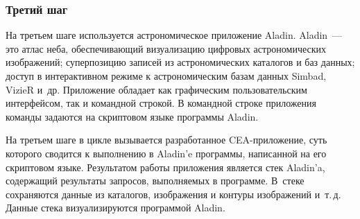 \begin{multicols}{2}
\subsubsection{Третий шаг}

     На третьем шаге используется астрономическое приложение Aladin. Aladin~--- это
атлас неба, обеспечивающий визуализацию цифровых астрономических изображений;
суперпозицию записей из астрономических каталогов и баз данных; доступ в
интерактивном режиме к астрономическим базам данных Simbad, VizieR и~др. Приложение
обладает как графическим пользовательским интерфейсом, так и командной строкой. В
командной строке приложения команды задаются на скриптовом языке программы Aladin.

     На третьем шаге в цикле вызывается разработанное CEA-приложение, суть которого
сводится к выполнению в Aladin'e программы, написанной на его скриптовом языке.
Результатом работы приложения является стек Aladin'a, содержащий
результаты запросов, выполняемых в программе. В~стеке сохраняются данные из каталогов,
изображения и контуры изображений и~т.\,д.
 Данные стека визуализируются программой Aladin.

\pagebreak

\end{multicols}

\begin{figure} %
\vspace*{1pt}
\begin{center}
\mbox{%
\epsfxsize=150mm
}
\end{center}
\vspace*{-6pt}
\end{figure}

